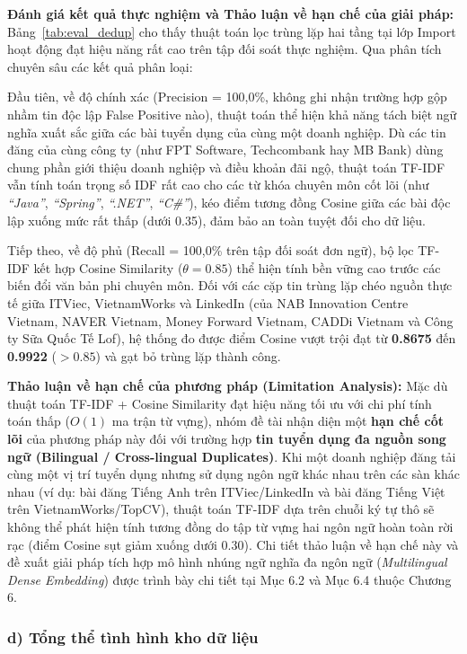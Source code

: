 \textbf{Đánh giá kết quả thực nghiệm và Thảo luận về hạn chế của giải pháp:} Bảng~\ref{tab:eval_dedup} cho thấy thuật toán lọc trùng lặp hai tầng tại lớp Import hoạt động đạt hiệu năng rất cao trên tập đối soát thực nghiệm. Qua phân tích chuyên sâu các kết quả phân loại:

Đầu tiên, về độ chính xác (Precision = 100,0\%, không ghi nhận trường hợp gộp nhầm tin độc lập False Positive nào), thuật toán thể hiện khả năng tách biệt ngữ nghĩa xuất sắc giữa các bài tuyển dụng của cùng một doanh nghiệp. Dù các tin đăng của cùng công ty (như FPT Software, Techcombank hay MB Bank) dùng chung phần giới thiệu doanh nghiệp và điều khoản đãi ngộ, thuật toán TF-IDF vẫn tính toán trọng số IDF rất cao cho các từ khóa chuyên môn cốt lõi (như \textit{``Java''}, \textit{``Spring''}, \textit{``.NET''}, \textit{``C\#''}), kéo điểm tương đồng Cosine giữa các bài độc lập xuống mức rất thấp (dưới 0.35), đảm bảo an toàn tuyệt đối cho dữ liệu.

Tiếp theo, về độ phủ (Recall = 100,0\% trên tập đối soát đơn ngữ), bộ lọc TF-IDF kết hợp Cosine Similarity ($\theta = 0.85$) thể hiện tính bền vững cao trước các biến đổi văn bản phi chuyên môn. Đối với các cặp tin trùng lặp chéo nguồn thực tế giữa ITViec, VietnamWorks và LinkedIn (của NAB Innovation Centre Vietnam, NAVER Vietnam, Money Forward Vietnam, CADDi Vietnam và Công ty Sữa Quốc Tế Lof), hệ thống đo được điểm Cosine vượt trội đạt từ \textbf{0.8675} đến \textbf{0.9922} ($> 0.85$) và gạt bỏ trùng lặp thành công.

\textbf{Thảo luận về hạn chế của phương pháp (Limitation Analysis):} Mặc dù thuật toán TF-IDF + Cosine Similarity đạt hiệu năng tối ưu với chi phí tính toán thấp ($O(1)$ ma trận từ vựng), nhóm đề tài nhận diện một \textbf{hạn chế cốt lõi} của phương pháp này đối với trường hợp \textbf{tin tuyển dụng đa nguồn song ngữ (Bilingual / Cross-lingual Duplicates)}. Khi một doanh nghiệp đăng tải cùng một vị trí tuyển dụng nhưng sử dụng ngôn ngữ khác nhau trên các sàn khác nhau (ví dụ: bài đăng Tiếng Anh trên ITViec/LinkedIn và bài đăng Tiếng Việt trên VietnamWorks/TopCV), thuật toán TF-IDF dựa trên chuỗi ký tự thô sẽ không thể phát hiện tính tương đồng do tập từ vựng hai ngôn ngữ hoàn toàn rời rạc (điểm Cosine sụt giảm xuống dưới 0.30). Chi tiết thảo luận về hạn chế này và đề xuất giải pháp tích hợp mô hình nhúng ngữ nghĩa đa ngôn ngữ (\textit{Multilingual Dense Embedding}) được trình bày chi tiết tại Mục 6.2 và Mục 6.4 thuộc Chương 6.



\subsubsection*{d) Tổng thể tình hình kho dữ liệu}
\label{subsubsec:etl_storage}

